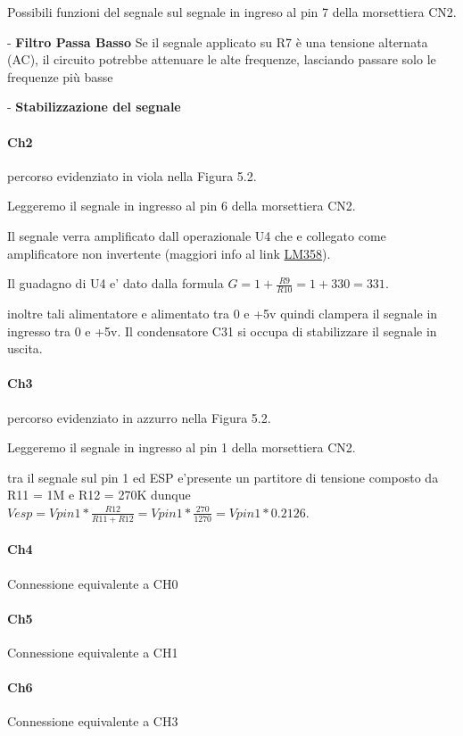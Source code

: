 \documentclass[12pt,a4paper]{report}
\begin{document}
Possibili funzioni del segnale sul segnale in ingreso al pin 7 della morsettiera CN2.

- \textbf{Filtro Passa Basso}
Se il segnale applicato su R7 è una tensione alternata (AC), il circuito potrebbe attenuare le alte frequenze, lasciando passare solo le frequenze più basse

- \textbf{Stabilizzazione del segnale}

\paragraph{Ch2}
percorso evidenziato in viola nella Figura 5.2.

Leggeremo il segnale in ingresso al pin 6 della morsettiera CN2.

Il segnale verra amplificato dall operazionale U4 che e collegato come amplificatore non invertente (maggiori info al link \href{https://elettronicasemplice.weebly.com/amplificatore-operazionale-non-invertente.html}{LM358}).

Il guadagno di U4 e' dato dalla formula $G = 1 + \frac{R9}{R10}= 1+330 = 331 $.

inoltre tali alimentatore e alimentato tra 0 e +5v quindi clampera il segnale in ingresso tra 0 e +5v.
Il condensatore C31 si occupa di stabilizzare il segnale in uscita.

\paragraph{Ch3}
percorso evidenziato in azzurro nella Figura 5.2.

Leggeremo il segnale in ingresso al pin 1 della morsettiera CN2.

tra il segnale sul pin 1 ed ESP e'presente un partitore di tensione composto da R11 = 1M e R12 = 270K dunque $Vesp = Vpin1 * \frac{R12}{R11+R12} = Vpin1 * \frac{270}{1270} = Vpin1 * 0.2126$.


\paragraph{Ch4}
Connessione equivalente a CH0 

\paragraph{Ch5}
Connessione equivalente a CH1

\paragraph{Ch6}
Connessione equivalente a CH3
\end{document}
